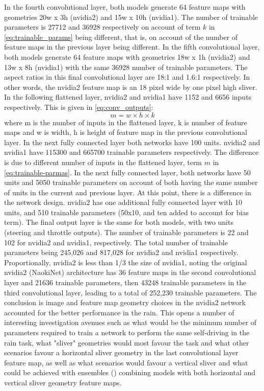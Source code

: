 In the fourth convolutional layer, both models generate 64 feature maps with geometries 20w x 3h (nvidia2) and 15w x 10h (nvidia1). The number of trainable parameters is 27712 and 36928 respectively on account of term $k$ in \ref{eq:trainable_params} being different, that is, on account of the number of feature maps in the previous layer being different.  
In the fifth convolutional layer, both models generate 64 feature maps with geometries 18w x 1h (nvidia2) and 13w x 8h (nvidia1) with the same 36928 number of trainable parameters. The aspect ratios in this final convolutional layer are 18:1 and 1.6:1 respectively. In other words, the nvidia2 feature map is an 18 pixel wide by one pixel high sliver.  
In the following flattened layer, nvidia2 and nvidia1 have 1152 and 6656 inputs respectively. This is given in \ref{eq:conv_outputs}:
\begin{equation}
    \label{eq:conv_outputs}
    m = w \times h \times k
\end{equation}
where m is the number of inputs in the flattened layer, k is number of feature maps and w is width, h is height of feature map in the previous convolutional layer.  
In the next fully connected layer both networks have 100 units. nvidia2 and nvidia1 have 115300 and 665700 trainable parameters respectively. The difference is due to different number of inputs in the flattened layer, term $m$ in \ref{eq:trainable-parmas}.  
In the next fully connected layer, both networks have 50 units and 5050 trainable parameters on account of both having the same number of units in the current and previous layer.  
At this point, there is a difference in the network design. nvidia2 has one additional fully connected layer with 10 units, and 510 trainable parameters (50x10, and ten added to account for bias term). The final output layer is the same for both models, with two units (steering and throttle outputs). The number of trainable parameters is 22 and 102 for nvidia2 and nvidia1, respectively.  
The total number of trainable parameters being 245,026 and 817,028 for nvidia2 and nvidia1 respectively. Proportionally, nvidia2 is less than 1/3 the size of nvidia1, noting the original nvidia2 (NaokiNet) architecture has 36 feature maps in the second convolutional layer and 21636 trainable parameters, then 43248 trainable parameters in the third convolutional layer, leading to a total of 252,230 trainable parameters.  
The conclusion is image and feature map geometry choices in the nvidia2 network accounted for the better performance in the rain. This opens a number of interesting investigation avenues such as what would be the minimum number of parameters required to train a network to perform the same self-driving in the rain task, what "sliver" geometries would most favour the task and what other scenarios favour a horizontal sliver geometry in the last convolutional layer feature map, as well as what scenarios would favour a vertical sliver and what could be achieved with ensembles (\cite{ren2016ensemble}) combining models with both horizontal and vertical sliver geometry feature maps.  
